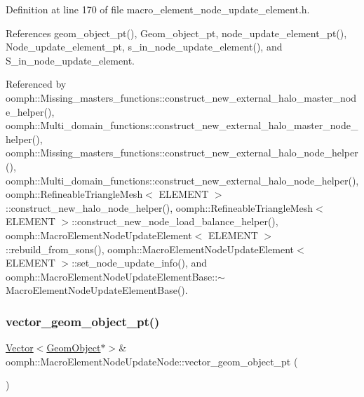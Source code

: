 Definition at line 170 of file macro\+\_\+element\+\_\+node\+\_\+update\+\_\+element.\+h.



References geom\+\_\+object\+\_\+pt(), Geom\+\_\+object\+\_\+pt, node\+\_\+update\+\_\+element\+\_\+pt(), Node\+\_\+update\+\_\+element\+\_\+pt, s\+\_\+in\+\_\+node\+\_\+update\+\_\+element(), and S\+\_\+in\+\_\+node\+\_\+update\+\_\+element.



Referenced by oomph\+::\+Missing\+\_\+masters\+\_\+functions\+::construct\+\_\+new\+\_\+external\+\_\+halo\+\_\+master\+\_\+node\+\_\+helper(), oomph\+::\+Multi\+\_\+domain\+\_\+functions\+::construct\+\_\+new\+\_\+external\+\_\+halo\+\_\+master\+\_\+node\+\_\+helper(), oomph\+::\+Missing\+\_\+masters\+\_\+functions\+::construct\+\_\+new\+\_\+external\+\_\+halo\+\_\+node\+\_\+helper(), oomph\+::\+Multi\+\_\+domain\+\_\+functions\+::construct\+\_\+new\+\_\+external\+\_\+halo\+\_\+node\+\_\+helper(), oomph\+::\+Refineable\+Triangle\+Mesh$<$ E\+L\+E\+M\+E\+N\+T $>$\+::construct\+\_\+new\+\_\+halo\+\_\+node\+\_\+helper(), oomph\+::\+Refineable\+Triangle\+Mesh$<$ E\+L\+E\+M\+E\+N\+T $>$\+::construct\+\_\+new\+\_\+node\+\_\+load\+\_\+balance\+\_\+helper(), oomph\+::\+Macro\+Element\+Node\+Update\+Element$<$ E\+L\+E\+M\+E\+N\+T $>$\+::rebuild\+\_\+from\+\_\+sons(), oomph\+::\+Macro\+Element\+Node\+Update\+Element$<$ E\+L\+E\+M\+E\+N\+T $>$\+::set\+\_\+node\+\_\+update\+\_\+info(), and oomph\+::\+Macro\+Element\+Node\+Update\+Element\+Base\+::$\sim$\+Macro\+Element\+Node\+Update\+Element\+Base().

\mbox{\label{classoomph_1_1MacroElementNodeUpdateNode_adde92d8a65196b8cf3fcadde57c1f008}} 
\subsubsection{\texorpdfstring{vector\+\_\+geom\+\_\+object\+\_\+pt()}{vector\_geom\_object\_pt()}}
{\footnotesize\ttfamily \hyperlink{classoomph_1_1Vector}{Vector}$<$\hyperlink{classoomph_1_1GeomObject}{Geom\+Object}$\ast$$>$\& oomph\+::\+Macro\+Element\+Node\+Update\+Node\+::vector\+\_\+geom\+\_\+object\+\_\+pt (\begin{DoxyParamCaption}{ }\end{DoxyParamCaption})\hspace{0.3cm}{\ttfamily [inline]}}



